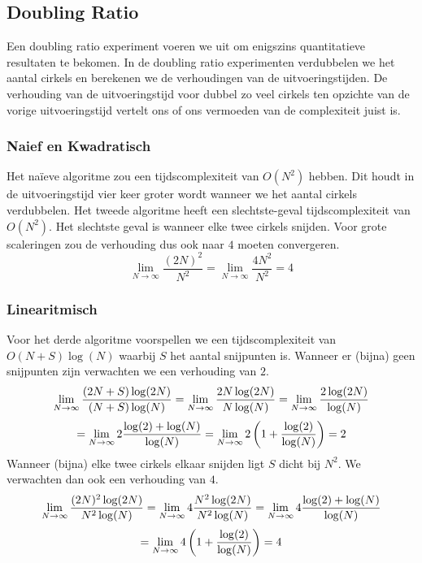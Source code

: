 \subsection{Doubling Ratio}
Een doubling ratio experiment voeren we uit om enigszins quantitatieve resultaten te bekomen. In de doubling ratio experimenten verdubbelen we het aantal cirkels en berekenen we de verhoudingen van de uitvoeringstijden. De verhouding van de uitvoeringstijd voor dubbel zo veel cirkels ten opzichte van de vorige uitvoeringstijd vertelt ons of ons vermoeden van de complexiteit juist is.

\subsubsection{Naief en Kwadratisch}
Het na\"ieve algoritme zou een tijdscomplexiteit van $O(N^2)$ hebben. Dit houdt in de uitvoeringstijd vier keer groter wordt wanneer we het aantal cirkels verdubbelen.
Het tweede algoritme heeft een slechtste-geval tijdscomplexiteit van $O(N^2)$. Het slechtste geval is wanneer elke twee cirkels snijden. Voor grote scaleringen zou de verhouding dus ook naar $4$ moeten convergeren.
\[
\lim_{N\rightarrow\infty}\frac{(2N)^2}{N^2}
= \lim_{N\rightarrow\infty}\frac{4N^2}{N^2}
= 4
\]

\subsubsection{Linearitmisch}
Voor het derde algoritme voorspellen we een tijdscomplexiteit van $O(N+S)\log(N)$ waarbij $S$ het aantal snijpunten is. Wanneer er (bijna) geen snijpunten zijn verwachten we een verhouding van $2$.
\[
\lim_{
N\rightarrow \infty\\
}
\frac{(2N+S)\log(2N)}{(N+S)\log(N)}
=
\lim_{
N\rightarrow \infty\\
}
\frac{2N\log(2N)}{N\log(N)}
=
\lim_{
N\rightarrow \infty\\
}
\frac{2\log(2N)}{\log(N)}
\]
\[
=
\lim_{
N\rightarrow \infty\\
}
2\frac{\log(2)+\log(N)}{\log(N)}
=
\lim_{
N\rightarrow \infty\\
}
2\left(1 + \frac{\log(2)}{\log(N)}\right)
= 2
\]
\noindent Wanneer (bijna) elke twee cirkels elkaar snijden ligt $S$ dicht bij $N^2$. We verwachten dan ook een verhouding van $4$.
\[
\lim_{
N\rightarrow \infty\\
}
\frac{(2N)^2\log(2N)}{N^2\log(N)}
=
\lim_{
N\rightarrow \infty\\
}
4\frac{N^2\log(2N)}{N^2\log(N)}
=
\lim_{
N\rightarrow \infty\\
}
4\frac{\log(2)+\log(N)}{\log(N)}
\]
\[
=
\lim_{
N\rightarrow \infty\\
}
4\left(1+\frac{\log(2)}{\log(N)}\right)
= 4
\]

